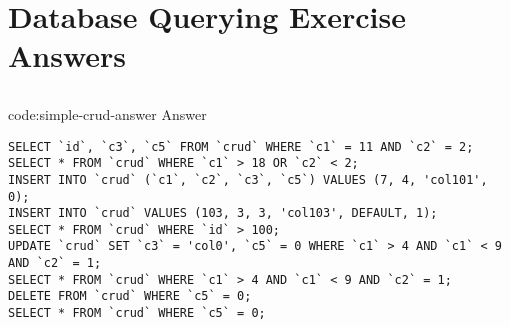 \section{Database Querying Exercise Answers}\label{sect:db-querying-answers}

\subsection*{}

\begin{codeenv}{code:simple-crud-answer}{ Answer}\begin{verbatim}
SELECT `id`, `c3`, `c5` FROM `crud` WHERE `c1` = 11 AND `c2` = 2;
SELECT * FROM `crud` WHERE `c1` > 18 OR `c2` < 2;
INSERT INTO `crud` (`c1`, `c2`, `c3`, `c5`) VALUES (7, 4, 'col101', 0);
INSERT INTO `crud` VALUES (103, 3, 3, 'col103', DEFAULT, 1);
SELECT * FROM `crud` WHERE `id` > 100;
UPDATE `crud` SET `c3` = 'col0', `c5` = 0 WHERE `c1` > 4 AND `c1` < 9 AND `c2` = 1;
SELECT * FROM `crud` WHERE `c1` > 4 AND `c1` < 9 AND `c2` = 1;
DELETE FROM `crud` WHERE `c5` = 0;
SELECT * FROM `crud` WHERE `c5` = 0;
\end{verbatim}
\end{codeenv}

\subsection*{}


